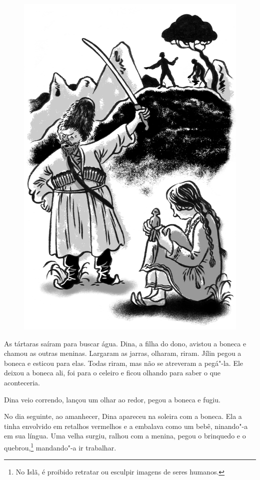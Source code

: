 \begin{figure}%
\vspace*{-1.9cm}
\hspace*{-2.175cm}\includegraphics{./imgs/cena4.jpg}
\end{figure}

As tártaras saíram para buscar água. Dina, a filha do dono, avistou a
boneca e chamou as outras meninas. Largaram as jarras, olharam, riram.
Jílin pegou a boneca e esticou para elas. Todas riram, mas não se
atreveram a pegá"-la. Ele deixou a boneca ali, foi para o celeiro e ficou
olhando para saber o que aconteceria.

Dina veio correndo, lançou um olhar ao redor, pegou a boneca e fugiu.

No dia seguinte, ao amanhecer, Dina apareceu na soleira com a boneca.
Ela a tinha envolvido em retalhos vermelhos e a embalava como um bebê,
ninando"-a em sua língua. Uma velha surgiu, ralhou com a menina, pegou o
brinquedo e o quebrou,\footnote{No Islã, é proibido retratar ou
  esculpir imagens de seres humanos.} mandando"-a ir trabalhar.



